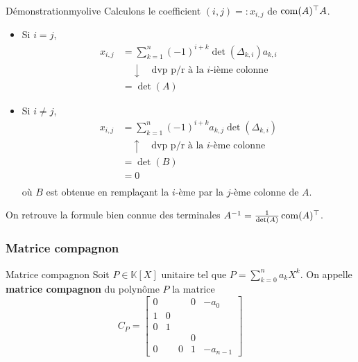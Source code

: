    \begin{demo}{Démonstration}{myolive}
        Calculons le coefficient $(i,j) =: x_{i,j}$ de $\operatorname{com}(A)^{\top} A$.
        \begin{itemize}
            \item Si $i= j$, 
            \begin{align*}
                x_{i,j} 
                &= \sum_{k=1}^{n} (-1)^{i + k} \det(\Delta_{k,i}) a_{k,i} \\
                &\quad \downarrow \quad \text{dvp p/r à la } i\text{-ième colonne} \\
                &= \det(A) 
            \end{align*}
            \item Si $i \neq j$, 
            \begin{align*}
                x_{i,j} 
                &= \sum_{k=1}^{n} (-1)^{i + k} a_{k,j} \det(\Delta_{k,i}) \\
                &\quad \uparrow \quad \text{dvp p/r à la } i\text{-ème colonne} \\
                &= \det(B) \\
                &= 0 \\
            \end{align*}
            où $B$ est obtenue en remplaçant la $i$-ème par la $j$-ème colonne de $A$.
        \end{itemize}
    \end{demo}

    On retrouve la formule bien connue des terminales $A^{-1} = \frac{1}{\det(A)} \operatorname{com}(A)^{\top}$.

    \subsubsection{Matrice compagnon}

    \begin{defi}{Matrice compagnon}{}
        Soit $P \in \mathbb{K}[X]$ unitaire tel que $P = \sum_{k=0}^{n} a_k X^k$. On appelle \textbf{matrice compagnon} du polynôme $P$ la matrice 
        \[ C_P = \begin{bmatrix}
            0 & & & 0 & -a_0 \\
            1 & 0 & & & \\
            0 & 1 & & & \\
            & & & 0 & \\
            0 & & 0 & 1 & -a_{n-1}
        \end{bmatrix} \] 
    \end{defi}


